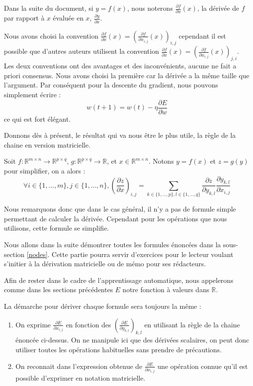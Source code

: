 \begin{remark}
Dans la suite du document, si $y = f(x)$, nous noterons $\frac{\partial f}{\partial x}(x)$, la dérivée de $f$ par rapport à $x$ évaluée en $x$, $\frac{\partial y}{\partial x}$.
\end{remark}

\begin{remark}
Nous avons choisi la convention $\frac{\partial f}{\partial x}(x) = (\frac{\partial f}{\partial x_{i, j}}(x))_{i, j}$ cependant il est possible que d'autres auteurs utilisent la convention $\frac{\partial f}{\partial x}(x) = (\frac{\partial f}{\partial x_{i, j}}(x))_{j, i}$. Les deux conventions ont des avantages et des inconvénients, aucune ne fait a priori consensus. Nous avons choisi la première car la dérivée a la même taille que l'argument. Par conséquent pour la descente du gradient, nous pouvons simplement écrire :
$$
w(t+1) = w(t) - \eta \frac{\partial E}{\partial w} 
$$
ce qui est fort élégant.
\end{remark}

Donnons dès à présent, le résultat qui va nous être le plus utile, la règle de la chaine en version matricielle.

\begin{proposition}
Soit $f : \mathbb{R}^{m \times n} \rightarrow \mathbb{R}^{p \times q}$, $g : \mathbb{R}^{p \times q} \rightarrow \mathbb{R}$, et $x \in \mathbb{R}^{m \times n}$. Notons $y = f(x)$ et $z = g(y)$ pour simplifier, on a alors :
$$
\forall i \in \{1, ..., m\}, j \in \{1, ..., n\}, (\frac{\partial z}{\partial x})_{i, j} = \sum_{k \in \{1, ..., p\}, l \in \{1, ..., q\}}{\frac{\partial z}{\partial y_{k, l}}\frac{\partial y_{k, l}}{\partial x_{i, j}}}
$$
\end{proposition}

Nous remarquons donc que dans le cas général, il n'y a pas de formule simple permettant de calculer la dérivée. Cependant pour les opérations que nous utilisons, cette formule se simplifie.

Nous allons dans la suite démontrer toutes les formules énoncées dans la sous-section \ref{nodes}. Cette partie pourra servir d'exercices pour le lecteur voulant s'initier à la dérivation matricielle ou de mémo pour ses rédacteurs.

Afin de rester dans le cadre de l'apprentissage automatique, nous appelerons comme dans les sections précédentes $E$ notre fonction à valeurs dans $\mathbb{R}$.

La démarche pour dériver chaque formule sera toujours la même :
\begin{enumerate}
\item On exprime $\frac{\partial E}{\partial x_{i, j}}$ en fonction des $(\frac{\partial E}{\partial y_{k, l}})_{k, l}$ en utilisant la règle de la chaine énoncée ci-dessus. On ne manipule ici que des dérivées scalaires, on peut donc utiliser toutes les opérations habituelles sans prendre de précautions.
\item On reconnait dans l'expression obtenue de $\frac{\partial E}{\partial x_{i, j}}$ une opération connue qu'il est possible d'exprimer en notation matricielle.
\end{enumerate}

